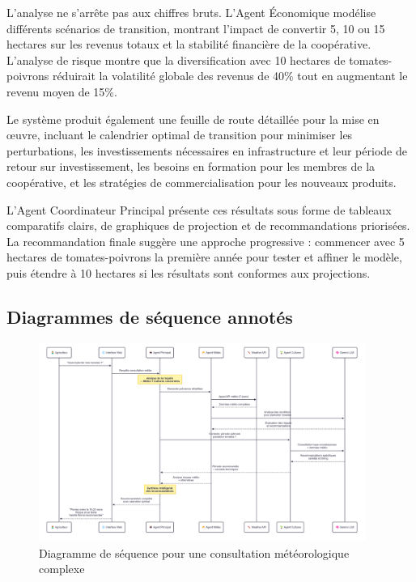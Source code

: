 L'analyse ne s'arrête pas aux chiffres bruts. L'Agent Économique modélise différents scénarios de transition, montrant l'impact de convertir 5, 10 ou 15 hectares sur les revenus totaux et la stabilité financière de la coopérative. L'analyse de risque montre que la diversification avec 10 hectares de tomates-poivrons réduirait la volatilité globale des revenus de 40\% tout en augmentant le revenu moyen de 15\%.

Le système produit également une feuille de route détaillée pour la mise en œuvre, incluant le calendrier optimal de transition pour minimiser les perturbations, les investissements nécessaires en infrastructure et leur période de retour sur investissement, les besoins en formation pour les membres de la coopérative, et les stratégies de commercialisation pour les nouveaux produits.

L'Agent Coordinateur Principal présente ces résultats sous forme de tableaux comparatifs clairs, de graphiques de projection et de recommandations priorisées. La recommandation finale suggère une approche progressive : commencer avec 5 hectares de tomates-poivrons la première année pour tester et affiner le modèle, puis étendre à 10 hectares si les résultats sont conformes aux projections.

\subsection{Diagrammes de séquence annotés}

\begin{figure}[H]
\centering
\includegraphics[width=0.95\textwidth]{images/sequence_diagram_weather.png}
\caption{Diagramme de séquence pour une consultation météorologique complexe}
\label{fig:sequence_weather}
\end{figure}

